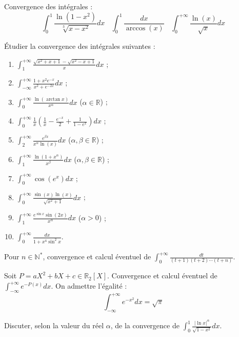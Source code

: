 \documentclass[french,a4paper]{article}
\newcommand{\N}{\mathbb{N}}
\newcommand{\R}{\mathbb{R}}
\newcommand{\st}{^*}
\theoremstyle{plain}
\theoremstyle{definition}
\theoremstyle{remark}
\begin{document}
\begin{ex}[Moulin.IG.23]{}
	Convergence des intégrales : $$\int_{0}^{1}\frac{\ln(1-x^2)}{\sqrt[3]{x-x^2}}dx\ \ \ \ \int_{0}^{1}\frac{dx}{\arccos(x)}\ \ \ \ \int_{0}^{+\infty}\frac{\ln(x)}{\sqrt{x}}dx$$
\end{ex}

\begin{ex}[Moulin.IG.24]{}
	Étudier la convergence des intégrales suivantes :
	\begin{enumerate}[label=(\roman*)]
		\item $\displaystyle\int_{1}^{+\infty}\frac{\sqrt{x^2+x+1}-\sqrt{x^2-x+1}}{x}dx$ ;
		\item $\displaystyle\int_{-\infty}^{+\infty}\frac{1+x^2e^{-x}}{x^2+e^{-2x}}dx$ ;
		\item $\displaystyle\int_{0}^{+\infty}\frac{\ln(\arctan x)}{x^\alpha}dx$ ($\alpha\in\R$) ;
		\item $\displaystyle\int_{0}^{+\infty}\frac{1}{x}\left(\frac{1}{x}-\frac{e^{-x}}{2}+\frac{1}{1-e^x}\right)dx$ ;
		\item $\displaystyle\int_{2}^{+\infty}\frac{e^{\beta x}}{x^\alpha\ln(x)}dx$ ($\alpha,\beta\in\R$) ;
		\item $\displaystyle\int_{1}^{+\infty}\frac{\ln(1+x^\alpha)}{x^\beta}dx$ ($\alpha,\beta\in\R$) ;
		\item $\displaystyle\int_{0}^{+\infty}\cos(e^x)dx$ ;
		\item $\displaystyle\int_{0}^{+\infty}\frac{\sin(x)\ln(x)}{\sqrt{x^2+1}}dx$ ;
		\item $\displaystyle\int_{1}^{+\infty}\frac{e^{\sin x}\sin(2x)}{x^\alpha}dx$ ($\alpha>0$) ;
		\item $\displaystyle\int_{0}^{+\infty}\frac{dx}{1+x^4\sin^2 x}$.
		\end{enumerate}
\end{ex}

\begin{ex}[Moulin.IG.25]{}
	Pour $n\in\N\st$, convergence et calcul éventuel de $\displaystyle\int_{0}^{+\infty}\frac{dt}{(t+1)(t+2)\cdots(t+n)}$.
\end{ex}

\begin{ex}[Moulin.IG.26]{}
	Soit $P=aX^2+bX+c\in\R_2[X]$. Convergence et calcul éventuel de $\displaystyle\int_{-\infty}^{+\infty}e^{-P(x)}dx$. On admettre l'égalité : $$\int_{-\infty}^{+\infty}e^{-x^2}dx=\sqrt{\pi}$$
\end{ex}

\begin{ex}[Moulin.IG.27]{}
	Discuter, selon la valeur du réel $\alpha$, de la convergence de $\displaystyle\int_{0}^{1}\frac{\lvert\ln x\rvert^\alpha}{\sqrt{1-x^2}}dx$.
\end{ex}
\end{document}
